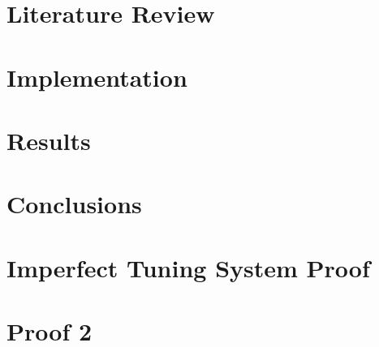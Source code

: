 \documentclass[12pt, twoside, openright]{report}
\begin{document}
\chapter{Literature Review}


\chapter{Implementation}


\chapter{Results}


\chapter{Conclusions}


{}


\appendix

\chapter{Imperfect Tuning System Proof}



\chapter{Proof 2}

\blindtext
\end{document}
